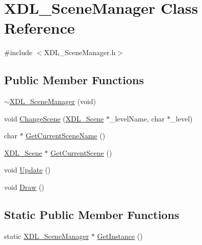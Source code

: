 \hypertarget{class_x_d_l___scene_manager}{\section{X\-D\-L\-\_\-\-Scene\-Manager Class Reference}
\label{class_x_d_l___scene_manager}
}


{\ttfamily \#include $<$X\-D\-L\-\_\-\-Scene\-Manager.\-h$>$}

\subsection*{Public Member Functions}
\begin{DoxyCompactItemize}
\item 
\hyperlink{class_x_d_l___scene_manager_acf72aec112908a2c7c694727256cca53}{$\sim$\-X\-D\-L\-\_\-\-Scene\-Manager} (void)
\item 
void \hyperlink{class_x_d_l___scene_manager_af5f8eae12e4346273fb9a2435cfe655b}{Change\-Scene} (\hyperlink{class_x_d_l___scene}{X\-D\-L\-\_\-\-Scene} $\ast$\-\_\-level\-Name, char $\ast$\-\_\-level)
\item 
char $\ast$ \hyperlink{class_x_d_l___scene_manager_ad3c4876932e507a849c54a66b88264de}{Get\-Current\-Scene\-Name} ()
\item 
\hyperlink{class_x_d_l___scene}{X\-D\-L\-\_\-\-Scene} $\ast$ \hyperlink{class_x_d_l___scene_manager_a8adee7ad0ab4cacc98a926848a88c955}{Get\-Current\-Scene} ()
\item 
void \hyperlink{class_x_d_l___scene_manager_a0c7a0611cf19993ce57d71d1f8becc64}{Update} ()
\item 
void \hyperlink{class_x_d_l___scene_manager_a8ec68a45cc1dd459f7154120dfea5b59}{Draw} ()
\end{DoxyCompactItemize}
\subsection*{Static Public Member Functions}
\begin{DoxyCompactItemize}
\item 
static \hyperlink{class_x_d_l___scene_manager}{X\-D\-L\-\_\-\-Scene\-Manager} $\ast$ \hyperlink{class_x_d_l___scene_manager_aee31018d3348547c1c331d05bbb0b039}{Get\-Instance} ()
\end{DoxyCompactItemize}


